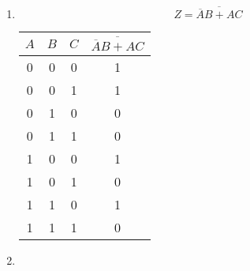 \documentclass[12pt letter]{report}
\begin{document}
{\begin{enumerate}
\begin{enumerate}
\begin{figure}[H]
                    \begin{center}
                    \end{center}
                  \end{figure}
            \item
                  \begin{figure}[H]
                    \begin{center}
                    \end{center}
                  \end{figure}
          \end{enumerate}
    \item
          \[
            Z = \overline{\overline{A} B + AC}
          \]
          \begin{table}[H]
            \begin{center}
              \begin{tabular}{|c c c|c|}
                \hline
                $A$ & $B$ & $C$ & $\overline{\overline{A} B + AC}$ \\ [0.5ex]
                \hline
                \hline
                0   & 0   & 0   & 1                                \\
                0   & 0   & 1   & 1                                \\
                0   & 1   & 0   & 0                                \\
                0   & 1   & 1   & 0                                \\
                1   & 0   & 0   & 1                                \\
                1   & 0   & 1   & 0                                \\
                1   & 1   & 0   & 1                                \\
                1   & 1   & 1   & 0                                \\
                \hline
              \end{tabular}
            \end{center}
          \end{table}
    \item
          \begin{figure}[H]
            \begin{center}

\end{center}
\end{figure}
\end{enumerate}}
\end{document}
